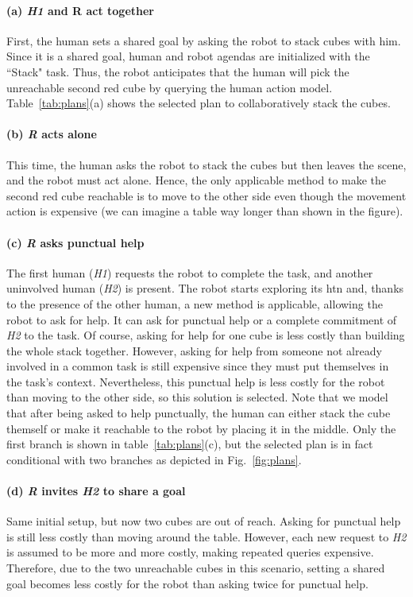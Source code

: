 \paragraph{(a) \textit{H1} and R act together}
First, the human sets a shared goal by asking the robot to stack cubes with him. Since it is a shared goal, human and robot agendas are initialized with the ``Stack" task. Thus, the robot anticipates that the human will pick the unreachable second red cube by querying the human action model. Table~\ref {tab:plans}(a) shows the selected plan to collaboratively stack the cubes. 

\paragraph{(b) \textit{R} acts alone}
This time, the human asks the robot to stack the cubes but then leaves the scene, and the robot must act alone. Hence, the only applicable method to make the second red cube reachable is to move to the other side even though the movement action is expensive (we can imagine a table way longer than shown in the figure).

\paragraph{(c) \textit{R} asks punctual help}
The first human (\textit{H1}) requests the robot to complete the task, and another uninvolved human (\textit{H2}) is present. The robot starts exploring its \acrshort{htn} and, thanks to the presence of the other human, a new method is applicable, allowing the robot to ask for help. It can ask for punctual help or a complete commitment of \textit{H2} to the task. Of course, asking for help for one cube is less costly than building the whole stack together. However, asking for help from someone not already involved in a common task is still expensive since they must put themselves in the task's context. 
Nevertheless, this punctual help is less costly for the robot than moving to the other side, so this solution is selected. Note that we model that after being asked to help punctually, the human can either stack the cube themself or make it reachable to the robot by placing it in the middle. Only the first branch is shown in table~\ref{tab:plans}(c), but the selected plan is in fact conditional with two branches as depicted in Fig.~\ref{fig:plans}.

\paragraph{(d) \textit{R} invites \textit{H2} to share a goal}
Same initial setup, but now two cubes are out of reach. Asking for punctual help is still less costly than moving around the table. 
However, each new request to \textit{H2} is assumed to be more and more costly, making repeated queries expensive.  
Therefore, due to the two unreachable cubes in this scenario, setting a shared goal becomes less costly for the robot than asking twice for punctual help.

